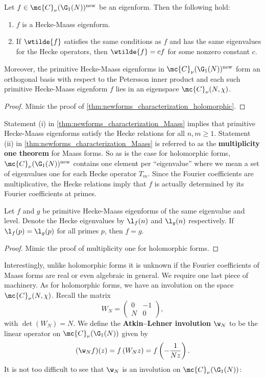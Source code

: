     \begin{theorem}\label{thm:newforms_characterization_Maass}
      Let $f \in \mc{C}_{\nu}(\G_{1}(N))^{\mathrm{new}}$ be an eigenform. Then the following hold:
      \begin{enumerate}[label=(\roman*)]
        \item $f$ is a Hecke-Maass eigenform.
        \item If $\wtilde{f}$ satisfies the same conditions as $f$ and has the same eigenvalues for the Hecke operators, then $\wtilde{f} = cf$ for some nonzero constant $c$.
      \end{enumerate}
      Moreover, the primitive Hecke-Maass eigenforms in $\mc{C}_{\nu}(\G_{1}(N))^{\mathrm{new}}$ form an orthogonal basis with respect to the Petersson inner product and each such primitive Hecke-Maass eigenform $f$ lies in an eigenspace $\mc{C}_{\nu}(N,\chi)$.
    \end{theorem}
    \begin{proof}
      Mimic the proof of \cref{thm:newforms_characterization_holomorphic}.
    \end{proof}

    Statement (i) in \cref{thm:newforms_characterization_Maass} implies that primitive Hecke-Maass eigenforms satisfy the Hecke relations for all $n,m \ge 1$. Statement (ii) in \cref{thm:newforms_characterization_Maass} is referred to as the \textbf{multiplicity one theorem} for Maass forms. So as is the case for holomorphic forms, $\mc{C}_{\nu}(\G_{1}(N))^{\mathrm{new}}$ contains one element per ``eigenvalue'' where we mean a set of eigenvalues one for each Hecke operator $T_{m}$. Since the Fourier coefficients are multiplicative, the Hecke relations imply that $f$ is actually determined by its Fourier coefficients at primes. 
    
    \begin{theorem}
      Let $f$ and $g$ be primitive Hecke-Maass eigenforms of the same eigenvalue and level. Denote the Hecke eigenvalues by $\l_{f}(n)$ and $\l_{g}(n)$ respectively. If $\l_{f}(p) = \l_{g}(p)$ for all primes $p$, then $f = g$.
    \end{theorem}
    \begin{proof}
      Mimic the proof of multiplicity one for holomorphic forms.
    \end{proof}

    Interestingly, unlike holomorphic forms it is unknown if the Fourier coefficients of Maass forms are real or even algebraic in general. We require one last piece of machinery. As for holomorphic forms, we have an involution on the space $\mc{C}_{\nu}(N,\chi)$. Recall the matrix
    \[
      W_{N} = \begin{pmatrix} 0 & -1 \\ N & 0 \end{pmatrix},
    \]
    with $\det(W_{N}) = N$. We define the \textbf{Atkin–Lehner involution} $\w_{N}$ to be the linear operator on $\mc{C}_{\nu}(\G_{1}(N))$ given by
    \[
      (\w_{N}f)(z) = f\left(W_{N}z\right) = f\left(-\frac{1}{Nz}\right).
    \]
    It is not too difficult to see that $\w_{N}$ is an involution on $\mc{C}_{\nu}(\G_{1}(N))$:

